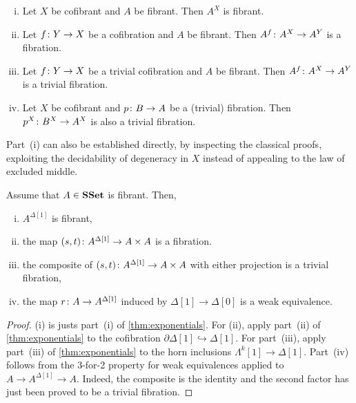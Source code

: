 \documentclass[reqno,10pt,a4paper,oneside,draft]{amsart}
\begin{document}
\begin{lemma} \hfill 
 \label{thm:exponentials}
\begin{enumerate}[(i)] 
\item Let $X$ be cofibrant and $A$ be fibrant.  Then $A^X$ is fibrant.
\item Let $f \colon Y \rightarrow X$ be a cofibration and $A$ be fibrant. Then $A^f \colon A^X \rightarrow A^Y$ is a fibration.
\item Let $f \colon Y \rightarrow X$ be a trivial cofibration and $A$ be fibrant.  Then $A^f \colon A^X \rightarrow A^Y$ is a trivial fibration.
\item Let $X$ be cofibrant and $p \colon B \rightarrow A$ be a (trivial) fibration. Then $p^X \colon B^X \rightarrow A^X$ is also a trivial fibration.
\end{enumerate}
\end{lemma}

Part~(i) can also be established directly, by inspecting the classical proofs, exploiting the decidability of degeneracy in $X$ instead of appealing to the law of excluded middle.






\medskip



\begin{proposition} \label{thm:id-types-for-types}
Assume that $A \in \mathbf{SSet}$ is fibrant. Then,
\begin{enumerate}[(i)] 
\item $A^{\Delta[1]}$ is fibrant,
\item the map $(s,t) \colon A^{\Delta[1]} \rightarrow A \times A$ is a fibration.
\item the composite of $(s, t) \colon A^{\Delta[1]} \rightarrow A \times A$ with either projection is a trivial fibration,
\item the map $r \colon A \rightarrow A^{\Delta[1]}$ induced by $\Delta[1] \rightarrow \Delta[0]$ is a weak equivalence.
\end{enumerate}
\end{proposition} 

\begin{proof}
(i) is justs part~(i) of \cref{thm:exponentials}. For (ii), apply part~(ii) of \cref{thm:exponentials} to the cofibration $\partial \Delta[1]  \hookrightarrow \Delta[1]$. For part~(iii), apply part~(iii) of \cref{thm:exponentials} to the horn inclusions $\Lambda^k[1]  \rightarrow \Delta[1]$. Part~(iv) follows from the 3-for-2 property for weak equivalences applied to $A \rightarrow A^{\Delta[1]} \rightarrow A$. Indeed, the
composite is the identity and the second factor has just been proved to be a trivial fibration.
\end{proof}
\end{document}
